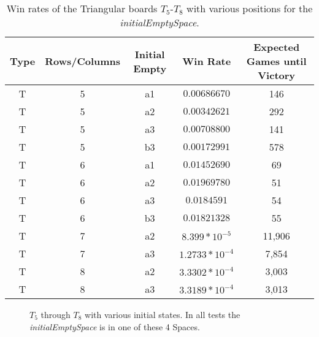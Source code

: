 \documentclass{article}
\begin{document}
\begin{table}[htb]
\begin{center} 
\begin{tabular}{ c  c  c  c  c }
\hline
\textbf{Type} & \textbf{Rows/Columns} &\textbf{Initial Empty} & \textbf{Win Rate} & \textbf{Expected Games until Victory}\\
\hline
T & 5 & a1 & $0.00686670$ & 146\\

T & 5 & a2 & $0.00342621$ & 292\\

T & 5 & a3 & $0.00708800$ & 141\\

T & 5 & b3 & $0.00172991$ & 578\\

T & 6 & a1 & $0.01452690$ & 69\\

T & 6 & a2 & $0.01969780$ & 51\\

T & 6 & a3 & $0.0184591$ & 54\\

T & 6 & b3 & $0.01821328$ & 55\\

T & 7 & a2 & $8.399*10^{-5}$& 11,906\\

T & 7 & a3 & $1.2733*10^{-4}$ & 7,854\\

T & 8 & a2 & $3.3302*10^{-4}$& 3,003\\

T & 8 & a3 & $3.3189*10^{-4}$ & 3,013\\

\end{tabular}
\caption{Win rates of the Triangular boards $T_5$-$T_8$ with various positions for the \textit{initialEmptySpace}.}
\label{tab3}
\end{center} 
\end{table}

\begin{figure}[htb]
\centering
{}
\caption{$T_5$ through $T_8$ with various initial states. In all tests the \textit{initialEmptySpace} is in one of these 4 Spaces.}
\label{fig8}
\end{figure}
\end{document}
